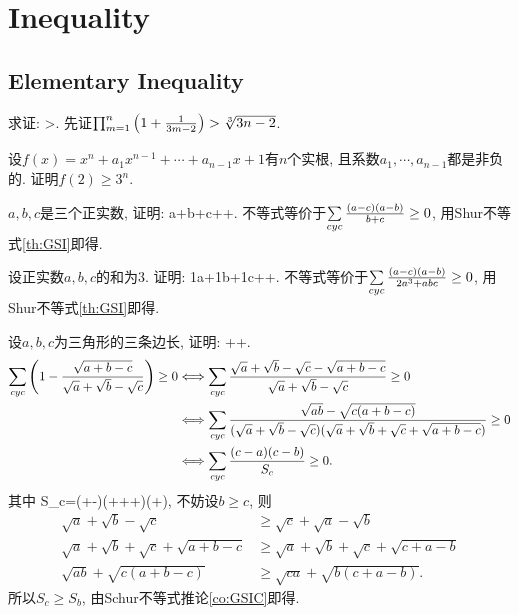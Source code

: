 \chapter{Inequality}
\section{Elementary Inequality}
\bq{}{}
求证: 
\bee
{}\cdots{}>.
\eee
\eq
\ba
先证$\prod_{m=1}^n\left(1+\frac{1}{3m-2}\right)>\sqrt[3]{3n-2}$.
\ea

\bq{}{}
设$f(x)=x^n+a_1x^{n-1}+\cdots+a_{n-1}x+1$有$n$个实根, 且系数$a_1,\cdots,a_{n-1}$都是非负的. 证明$f(2)\ge3^n$.
\eq

$a,b,c$是三个正实数, 证明:
\bee
a+b+c\le{}++.
\eee
\eq
\ba
不等式等价于$\sum\limits_{cyc}\frac{(a-c)(a-b)}{b+c}\ge0$, 用Shur不等式\ref{th:GSI}即得.
\ea

\bq{}{}
设正实数$a,b,c$的和为$3$. 证明:
\bee
\frac1a+\frac1b+\frac1c\ge{}++.
\eee
\eq
\ba
不等式等价于$\sum\limits_{cyc}\frac{(a-c)(a-b)}{2a^3+abc}\ge0$, 用Shur不等式\ref{th:GSI}即得.
\ea

设$a,b,c$为三角形的三条边长, 证明:
\bee
{}++.
\eee
\eq
\ba
\begin{align*}
\sum\limits_{cyc}\left(1-\frac{\sqrt{a+b-c}}{\sqrt{a}+\sqrt{b}-\sqrt{c}}\right)\ge0
  & \Longleftrightarrow\sum\limits_{cyc}\frac{\sqrt{a}+\sqrt{b}-\sqrt{c}-\sqrt{a+b-c}}{\sqrt{a}+\sqrt{b}-\sqrt{c}}\ge0\\
  & \Longleftrightarrow\sum\limits_{cyc}\frac{\sqrt{ab}-\sqrt{c(a+b-c)}}{(\sqrt{a}+\sqrt{b}-\sqrt{c})(\sqrt{a}+\sqrt{b}+\sqrt{c}+\sqrt{a+b-c})}\ge0\\
  & \Longleftrightarrow\sum\limits_{cyc}\frac{(c-a)(c-b)}{S_c}\ge0.
\end{align*}
其中
\bee
S_c=(+-)(+++)(+),
\eee
不妨设$b\ge c$, 则
\begin{align*}
\sqrt{a}+\sqrt{b}-\sqrt{c}&\ge\sqrt{c}+\sqrt{a}-\sqrt{b}\\
\sqrt{a}+\sqrt{b}+\sqrt{c}+\sqrt{a+b-c}&\ge\sqrt{a}+\sqrt{b}+\sqrt{c}+\sqrt{c+a-b}\\
\sqrt{ab}+\sqrt{c(a+b-c)}&\ge\sqrt{ca}+\sqrt{b(c+a-b)}.
\end{align*}
所以$S_c\ge S_b$, 由Schur不等式推论\ref{co:GSIC}即得.
\ea

